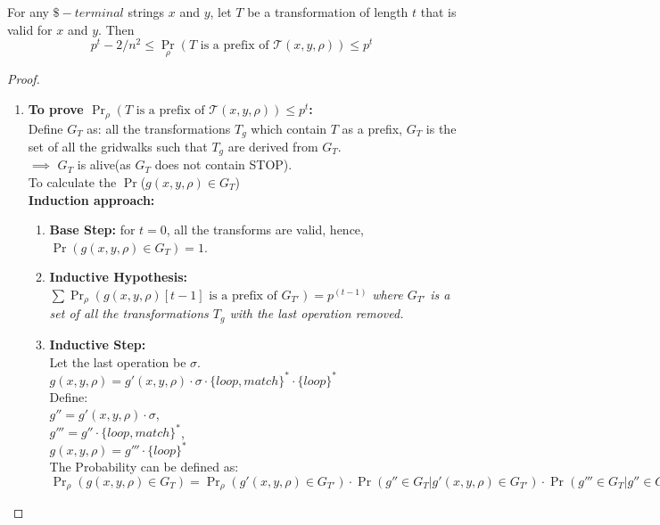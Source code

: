 \documentclass{article}
\begin{document}
\begin{lem} 
    For any $\$-terminal$ strings $x$ and $y$, let $T$ be a transformation of 
    length $t$ that is valid for $x$ and $y$. Then
    $$p^t-2/n^2 \leq \Pr_\rho(T\text{ is a prefix of }\mathcal{T}(x,y,\rho)) 
    \leq p^t$$
\end{lem}
\begin{proof}
    \begin{enumerate}
        \item \textbf{To prove $\Pr_\rho(T\text{ is a prefix of }\mathcal{T}(x,y
        ,\rho)) \leq p^t$:}\\
        Define $G_T$ as: all the transformations $T_g$ which contain $T$ as a 
        prefix, $G_T$ is the set of all the gridwalks such that $T_g$ are 
        derived from $G_T$.\\
        $\implies$ $G_T$ is alive(as $G_T$ does not contain STOP).\\
        To calculate the $\Pr$($g(x,y,\rho)\in G_T$)\\
        \textbf{Induction approach:}
        \begin{enumerate}
            \item \textbf{Base Step:} for $t=0$, all the transforms are valid, 
            hence, $\Pr(g(x,y,\rho)\in G_T)=1$.
            \item \textbf{Inductive Hypothesis: }$\sum\Pr_\rho(g(x,y,\rho)[t-1]
            \text{ is a prefix of }G_{T'})=p^{(t-1)}$ \textit{where $G_{T'}$ is 
            a set of all the transformations $T_g$ with the last operation 
            removed.}
            \item \textbf{Inductive Step: }\\
            Let the last operation be $\sigma$.\\
            $g(x,y,\rho)=g'(x,y,\rho)\cdot \sigma\cdot\{loop,match\}^*\cdot
            \{loop\}^*$\\
            Define: \\
            $g''=g'(x,y,\rho)\cdot \sigma$,\\
            $g'''=g''\cdot \{loop,match\}^*$,\\
            $g(x,y,\rho) = g'''\cdot\{loop\}^*$\\
            The Probability can be defined as:\\
            $\Pr_\rho(g(x,y,\rho)\in G_T)=\Pr_\rho(g'(x,y,\rho)\in G_{T'})\cdot
            \Pr(g''\in G_T|g'(x,y,\rho)\in G_{T'})\cdot \Pr(g'''\in G_T|g''\in 
            G_T)\cdot\Pr_\rho(g(x,y,\rho)\in G_T|g'''\in G_T)$\\

\end{enumerate}
\end{enumerate}
\end{proof}
\end{document}
